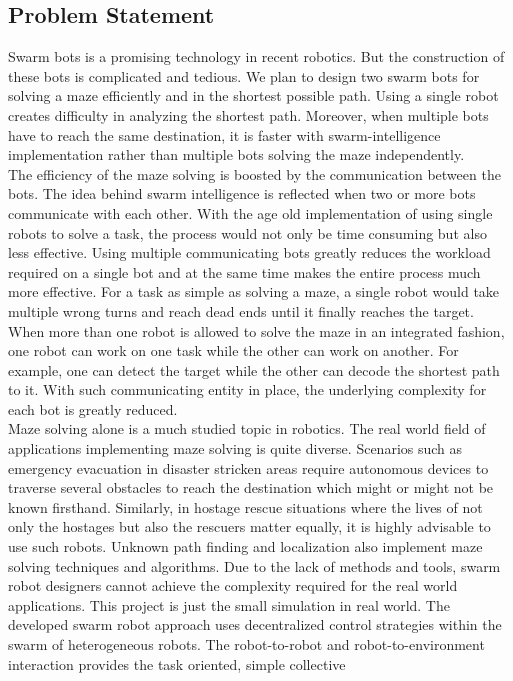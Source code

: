 \subsection{Problem Statement}
Swarm bots is a promising technology in recent robotics. But the construction of these bots is
complicated and tedious. We plan to design two swarm bots for solving a maze efficiently and in the
shortest possible path. Using a single robot creates difficulty in analyzing the shortest path. Moreover,
when multiple bots have to reach the same destination, it is faster with swarm-intelligence
implementation rather than multiple bots solving the maze independently.\\
The efficiency of the maze solving is boosted by the communication between the bots. The idea behind
swarm intelligence is reflected when two or more bots communicate with each other. With the age old
implementation of using single robots to solve a task, the process would not only be time consuming
but also less effective. Using multiple communicating bots greatly reduces the workload required on a
single bot and at the same time makes the entire process much more effective. For a task as simple as
solving a maze, a single robot would take multiple wrong turns and reach dead ends until it finally
reaches the target. When more than one robot is allowed to solve the maze in an integrated fashion, one
robot can work on one task while the other can work on another. For example, one can detect the target
while the other can decode the shortest path to it. With such communicating entity in place, the
underlying complexity for each bot is greatly reduced.\\
Maze solving alone is a much studied topic in robotics. The real world field of applications
implementing maze solving is quite diverse. Scenarios such as emergency evacuation in disaster
stricken areas require autonomous devices to traverse several obstacles to reach the destination which
might or might not be known firsthand. Similarly, in hostage rescue situations where the lives of not
only the hostages but also the rescuers matter equally, it is highly advisable to use such robots.
Unknown path finding and localization also implement maze solving techniques and algorithms.
Due to the lack of methods and tools, swarm robot designers cannot achieve the complexity required
for the real world applications. This project is just the small simulation in real world. The developed
swarm robot approach uses decentralized control strategies within the swarm of heterogeneous robots.
The robot-to-robot and robot-to-environment interaction provides the task oriented, simple collective
